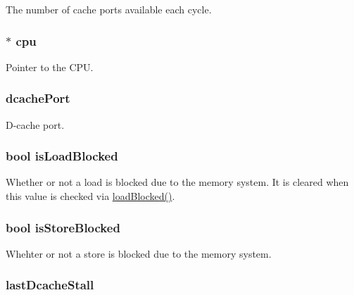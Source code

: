 The number of cache ports available each cycle. \hypertarget{classOzoneLWLSQ_a61b5f503eec141308b0cd6b4322b405b}{
\subsubsection[{cpu}]{$\ast$ {\bf cpu}}}
\label{classOzoneLWLSQ_a61b5f503eec141308b0cd6b4322b405b}
Pointer to the CPU. \hypertarget{classOzoneLWLSQ_a38b03978ad7720fdc910ff6a8b44585f}{
\subsubsection[{dcachePort}]{ {\bf dcachePort}}}
\label{classOzoneLWLSQ_a38b03978ad7720fdc910ff6a8b44585f}
D-\/cache port. \hypertarget{classOzoneLWLSQ_a95dc31b4ce3ebcb6b9d75a510b3a128c}{
\subsubsection[{isLoadBlocked}]{\setlength{\rightskip}{0pt plus 5cm}bool {\bf isLoadBlocked}}}
\label{classOzoneLWLSQ_a95dc31b4ce3ebcb6b9d75a510b3a128c}
Whether or not a load is blocked due to the memory system. It is cleared when this value is checked via \hyperlink{classOzoneLWLSQ_a05c413ba417c6453e99f75d87c958590}{loadBlocked()}. \hypertarget{classOzoneLWLSQ_a89d931c74b63e0b0e7ad856fe9525ff6}{
\subsubsection[{isStoreBlocked}]{\setlength{\rightskip}{0pt plus 5cm}bool {\bf isStoreBlocked}}}
\label{classOzoneLWLSQ_a89d931c74b63e0b0e7ad856fe9525ff6}
Whehter or not a store is blocked due to the memory system. \hypertarget{classOzoneLWLSQ_a8b4696062ef09ab956804a7a99491853}{
\subsubsection[{lastDcacheStall}]{ {\bf lastDcacheStall}}}
